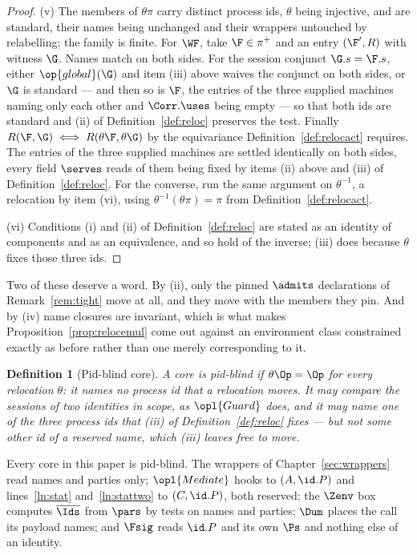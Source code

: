 \documentclass[10pt,oneside,openany]{book}
\theoremstyle{accentdef}
\newtheorem{definition}{Definition}[chapter]
\theoremstyle{accentplain}
\begin{document}
\begin{proof}
(v) The members of $\theta\pi$ carry distinct process ids, $\theta$ being injective, and are
standard, their names being unchanged and their wrappers untouched by relabelling; the family is
finite. For $\WF$, take $\F \in \pi^{+}$ and an entry $(\F',R)$ with witness $\G$. Names match on
both sides. For the session conjunct $\G.s = \F.s$, either $\op{global}(\G)$ and item (iii) above
waives the conjunct on both sides, or $\G$ is standard --- and then so is $\F$, the entries of the
three supplied machines naming only each other and $\Corr.\uses$ being empty --- so that both ids are
standard and (ii) of Definition~\ref{def:reloc} preserves the test. Finally
$R(\F,\G) \iff R(\theta\F,\theta\G)$ by the equivariance
Definition~\ref{def:relocact} requires. The entries of the
three supplied machines are settled identically on both sides, every field $\serves$ reads of them
being fixed by items (ii) above and (iii) of Definition~\ref{def:reloc}. For the converse, run the
same argument on $\theta^{-1}$, a relocation by item (vi), using
$\theta^{-1}(\theta\pi) = \pi$ from Definition~\ref{def:relocact}.

(vi) Conditions (i) and (ii) of Definition~\ref{def:reloc} are stated as an identity of components and
as an equivalence, and so hold of the inverse; (iii) does because $\theta$ fixes those three ids.
\end{proof}

Two of these deserve a word. By (ii), only the pinned $\admits$ declarations of
Remark~\ref{rem:tight} move at all, and they move with the members they pin. And by (iv) name
closures are invariant, which is what makes Proposition~\ref{prop:relocemul} come out against an
environment class constrained exactly as before rather than one merely corresponding to it.

\begin{definition}[Pid-blind core]\label{def:pidblind}
A core is \emph{pid-blind} if $\theta\Op = \Op$ for every relocation $\theta$: it names no process
id that a relocation moves. It may compare the sessions of two identities in scope, as $\opl{Guard}$
does, and it may name one of the three process ids that (iii) of Definition~\ref{def:reloc} fixes ---
but not some other id of a reserved name, which (iii) leaves free to move.
\end{definition}

Every core in this paper is pid-blind. The wrappers of Chapter~\ref{sec:wrappers} read names and
parties only; $\opl{Mediate}$ hooks to $(A,\id.P)$ and lines~\ref{ln:stat} and~\ref{ln:stattwo} to
$(C,\id.P)$, both reserved; the $\Zenv$ box computes $\overline{\Ids}$ from $\pars$ by tests on
names and parties; $\Dum$ places the call its payload names; and $\Fsig$ reads $\id.P$ and its own
$\Ps$ and nothing else of an identity.
\end{document}
